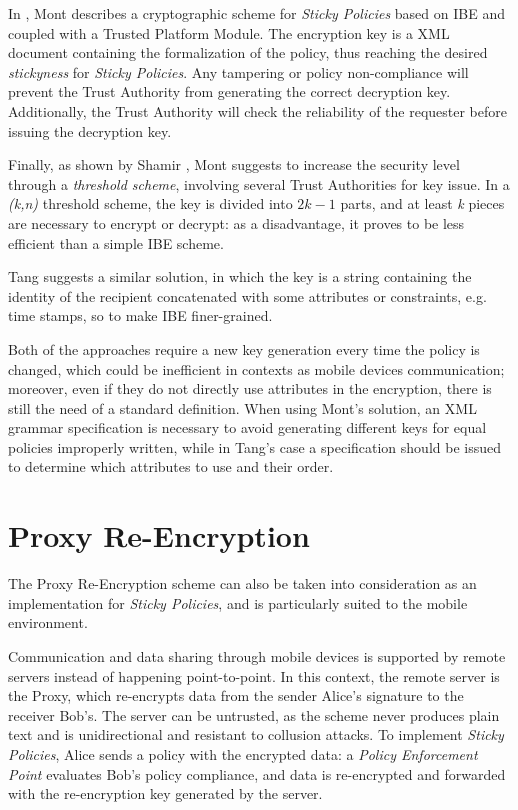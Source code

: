 In \cite{mont2003towards}, Mont describes a cryptographic scheme for \textit{Sticky Policies} based on IBE and coupled with a Trusted Platform Module. The encryption key is a XML document containing the formalization of the policy, thus reaching the desired \textit{stickyness} for \textit{Sticky Policies}. Any tampering or policy non-compliance will prevent the Trust Authority from generating the correct decryption key. Additionally, the Trust Authority will check the reliability of the requester before issuing the decryption key. 

Finally, as shown by Shamir \cite{shamir1979share}, Mont suggests to increase the security level through a \textit{threshold scheme}, involving several Trust Authorities for key issue. In a \textit{(k,n)} threshold scheme, the key is divided into \(2k-1\) parts, and at least \textit{k} pieces are necessary to encrypt or decrypt: as a disadvantage, it proves to be less efficient than a simple IBE scheme.

Tang \cite{tang2008using} suggests a similar solution, in which the key is a string containing the identity of the recipient concatenated with some attributes or constraints, e.g. time stamps, so to make IBE finer-grained.

Both of the approaches require a new key generation every time the policy is changed, which could be inefficient in contexts as mobile devices communication; moreover, even if they do not directly use attributes in the encryption, there is still the need of a standard definition. When using Mont's solution, an XML grammar specification is necessary to avoid generating different keys for equal policies improperly written, while in Tang's case a specification should be issued to determine which attributes to use and their order.

\section{Proxy Re-Encryption}
The Proxy Re-Encryption scheme \cite{green2007identity} can also be taken into consideration as an implementation for \textit{Sticky Policies}, and is particularly suited to the mobile environment.

Communication and data sharing through mobile devices is supported by remote servers instead of happening point-to-point. In this context, the remote server is the Proxy, which re-encrypts data from the sender Alice's signature to the receiver Bob's. The server can be untrusted, as the scheme never produces plain text and is unidirectional and resistant to collusion attacks. To implement \textit{Sticky Policies}, Alice sends a policy with the encrypted data: a \textit{Policy Enforcement Point} evaluates Bob's policy compliance, and data is re-encrypted and forwarded with the re-encryption key generated by the server.

